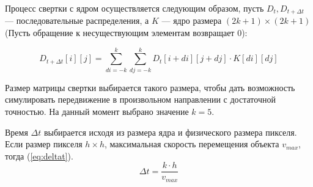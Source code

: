 Процесс свертки с ядром осуществляется следующим образом, пусть $D_t, D_{t+\Delta t}$ ---
последовательные распределения, а $K$ --- ядро размера $(2k+1) \times (2k+1)$
(Пусть обращение к несуществующим элементам возвращает 0):

\begin{equation}
  D_{t+\Delta t}[i][j] = \sum\limits_{di=-k}^k \sum\limits_{dj=-k}^k D_t[i+di][j+dj] \cdot K[di][dj]
\end{equation}

Размер матрицы свертки выбирается такого размера, чтобы дать возможность симулировать
передвижение в произвольном направлении с достаточной точностью. На данный момент выбрано
значение $k = 5$.

Время $\Delta t$ выбирается исходя из размера ядра и физического размера пикселя.
Если размер пикселя $h \times h$, максимальная скорость перемещения объекта $v_{max}$,
тогда (\ref{eq:deltat}). 
\begin{equation}\label{eq:deltat}
  \Delta t = \frac {k \cdot h} {v_{max}}
\end{equation}

